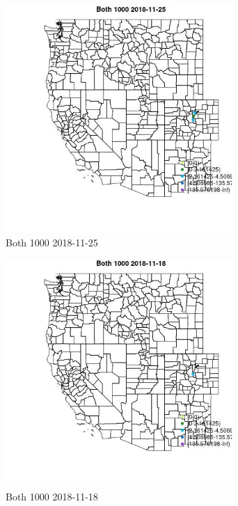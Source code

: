 \begin{figure} 
\centering  
\includegraphics[width=0.77\textwidth]{Code_Outputs/Report_ML_input_PM25_Step4_part_e_de_duplicated_aveswNAs_MapObsBoth_10002018-11-25.jpg} 
\caption{\label{fig:Report_ML_input_PM25_Step4_part_e_de_duplicated_aveswNAsMapObsBoth_10002018-11-25}Both 1000 2018-11-25} 
\end{figure} 
 

\begin{figure} 
\centering  
\includegraphics[width=0.77\textwidth]{Code_Outputs/Report_ML_input_PM25_Step4_part_e_de_duplicated_aveswNAs_MapObsBoth_10002018-11-18.jpg} 
\caption{\label{fig:Report_ML_input_PM25_Step4_part_e_de_duplicated_aveswNAsMapObsBoth_10002018-11-18}Both 1000 2018-11-18} 
\end{figure} 
 

